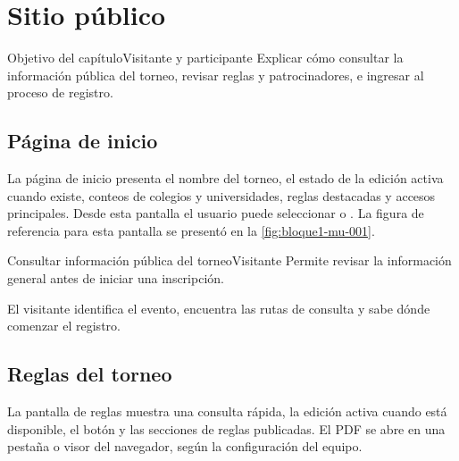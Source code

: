 \chapter{Sitio público}
\label{cap:sitio-publico}

\begin{procedimiento}{Objetivo del capítulo}{Visitante y participante}
Explicar cómo consultar la información pública del torneo, revisar reglas y patrocinadores, e ingresar al proceso de registro.
\end{procedimiento}

\section{Página de inicio}

La página de inicio presenta el nombre del torneo, el estado de la edición activa cuando existe, conteos de colegios y universidades, reglas destacadas y accesos principales. Desde esta pantalla el usuario puede seleccionar  o . La figura de referencia para esta pantalla se presentó en la \cref{fig:bloque1-mu-001}.

\begin{procedimiento}{Consultar información pública del torneo}{Visitante}
Permite revisar la información general antes de iniciar una inscripción.
\end{procedimiento}


\begin{resultadoesperado}
El visitante identifica el evento, encuentra las rutas de consulta y sabe dónde comenzar el registro.
\end{resultadoesperado}

\section{Reglas del torneo}

La pantalla de reglas muestra una consulta rápida, la edición activa cuando está disponible, el botón  y las secciones de reglas publicadas. El PDF se abre en una pestaña o visor del navegador, según la configuración del equipo.

